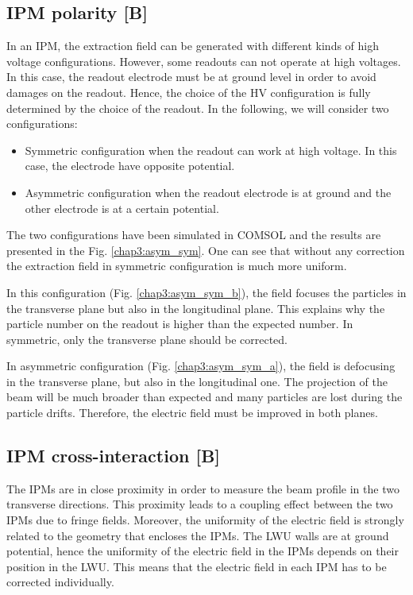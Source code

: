 \begin{refsection}
  \subsection{IPM polarity [B]}

  In an IPM, the extraction field can be generated with different kinds of high voltage configurations. However, some readouts can not operate at high voltages. In this case, the readout electrode must be at ground level in order to avoid damages on the readout. Hence, the choice of the HV configuration is fully determined by the choice of the readout. In the following, we will consider two configurations:
  \begin{itemize}
    \item Symmetric configuration when the readout can work at high voltage. In this case, the electrode have opposite potential.
    \item Asymmetric configuration when the readout electrode is at ground and the other electrode is at a certain potential.
  \end{itemize}

  The two configurations have been simulated in COMSOL and the results are presented in the Fig. \ref{chap3:asym_sym}. One can see that without any correction the extraction field in symmetric configuration is much more uniform.

  

  In this configuration (Fig. \ref{chap3:asym_sym_b}), the field focuses the particles in the transverse plane but also in the longitudinal plane. This explains why the particle number on the readout is higher than the expected number. In symmetric, only the transverse plane should be corrected.

  In asymmetric configuration (Fig. \ref{chap3:asym_sym_a}), the field is defocusing in the transverse plane, but also in the  longitudinal one. The projection of the beam will be much broader than expected and many particles are lost during the particle drifts. Therefore, the electric field must be improved in both planes.


  \subsection{IPM cross-interaction [B]}

  The IPMs are in close proximity in order to measure the beam profile in the two transverse  directions. This proximity leads to a coupling effect between the two IPMs due to fringe fields. Moreover, the uniformity of the electric field is strongly related to the geometry that encloses the IPMs. The LWU walls are at ground potential, hence the uniformity of the electric field in the IPMs depends on their position in the LWU. This means that the electric field in each IPM has to be corrected individually.


\end{refsection}
